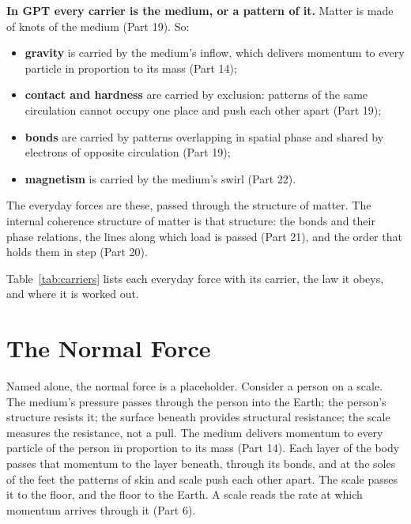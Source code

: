 \begin{hypbar}
\textbf{In GPT every carrier is the medium, or a pattern of it.} Matter is made of knots of the medium (Part 19).\footnotemark{} So:
\begin{itemize}
\item \textbf{gravity} is carried by the medium's inflow, which delivers momentum to every particle in proportion to its mass (Part 14);
\item \textbf{contact and hardness} are carried by exclusion: patterns of the same circulation cannot occupy one place and push each other apart (Part 19);
\item \textbf{bonds} are carried by patterns overlapping in spatial phase and shared by electrons of opposite circulation (Part 19);
\item \textbf{magnetism} is carried by the medium's swirl (Part 22).\footnotemark{}
\end{itemize}
The everyday forces are these, passed through the structure of matter. The internal coherence structure of matter is that structure: the bonds and their phase relations, the lines along which load is passed (Part 21), and the order that holds them in step (Part 20).
\end{hypbar}
\addtocounter{footnote}{-1}

Table~\ref{tab:carriers} lists each everyday force with its carrier, the law it obeys, and where it is worked out.

\section{The Normal Force}

Named alone, the normal force is a placeholder. Consider a person on a scale. The medium's pressure passes through the person into the Earth; the person's structure resists it; the surface beneath provides structural resistance; the scale measures the resistance, not a pull.  The medium delivers momentum to every particle of the person in proportion to its mass (Part 14). Each layer of the body passes that momentum to the layer beneath, through its bonds, and at the soles of the feet the patterns of skin and scale push each other apart. The scale passes it to the floor, and the floor to the Earth. A scale reads the rate at which momentum arrives through it (Part 6).


